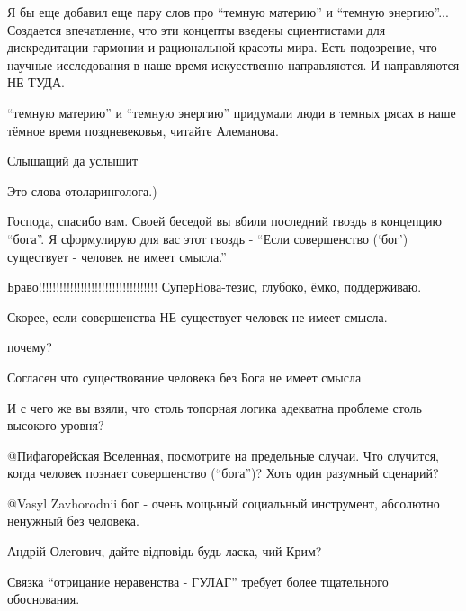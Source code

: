 \begin{multicols}{2}
Я бы еще добавил еще пару слов про \enquote{темную материю} и \enquote{темную энергию}...
Создается впечатление, что эти концепты введены сциентистами для дискредитации
гармонии и рациональной красоты мира. Есть подозрение, что научные исследования
в наше время искусственно направляются. И направляются НЕ ТУДА.

\begin{itemize} %
\enquote{темную материю} и \enquote{темную энергию} придумали люди в темных рясах в наше тёмное время поздневековья, читайте Алеманова.
\end{itemize} %

Слышащий да услышит

Это слова отоларинголога.)


Господа, спасибо вам. Своей беседой вы вбили последний гвоздь в концепцию
\enquote{бога}. Я сформулирую для вас этот гвоздь - \enquote{Если совершенство 
(\enquote{бог})
существует - человек не имеет смысла.}

\begin{itemize} %
Браво!!!!!!!!!!!!!!!!!!!!!!!!!!!!!!!!!! СуперНова-тезис, глубоко, ёмко, поддерживаю.

Скорее, если совершенства НЕ существует-человек не имеет смысла.

почему?

Согласен что существование человека без Бога не имеет смысла

И с чего же вы взяли, что столь топорная логика адекватна проблеме столь высокого уровня?

 @Пифагорейская Вселенная, посмотрите на предельные случаи. Что случится, когда человек познает совершенство (\enquote{бога})? Хоть один разумный сценарий?

 @Vasyl Zavhorodnii  бог - очень мощьный социальный инструмент, абсолютно ненужный без человека.
\end{itemize} %


Андрій Олегович, дайте відповідь будь-ласка, чий Крим?

Связка \enquote{отрицание неравенства - ГУЛАГ} требует более тщательного обоснования.


\end{multicols}

